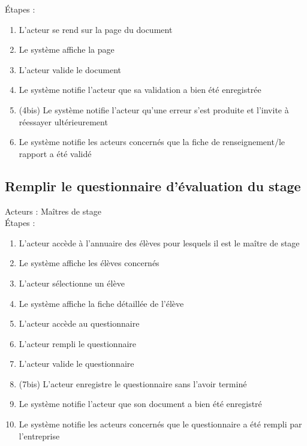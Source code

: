 \documentclass{scrreprt}
\begin{document}
\'Etapes : 
\begin{enumerate}
\item L’acteur se rend sur la page du document
\item Le système affiche la page
\item L’acteur valide le document
\item Le système notifie l’acteur que sa validation a bien été enregistrée
\item (4bis) Le système notifie l’acteur qu’une erreur s’est produite et l’invite à réessayer ultérieurement
\item Le système notifie les acteurs concernés que la fiche de renseignement/le rapport a été validé
\end{enumerate}


\subsection{Remplir le questionnaire d’\'evaluation du stage}
Acteurs : Ma\^itres de stage 
\\
\'Etapes : 
\begin{enumerate}
\item L’acteur acc\`ede \`a l’annuaire des \'el\`eves pour lesquels il est le ma\^itre de stage
\item Le syst\`eme affiche les \'el\`eves concern\'es
\item L’acteur s\'electionne un \'el\`eve
\item Le syst\`eme affiche la fiche d\'etaill\'ee de l’\'el\`eve
\item L’acteur acc\`ede au questionnaire 
\item L’acteur rempli le questionnaire 
\item L’acteur valide le questionnaire
\item (7bis) L’acteur enregistre le questionnaire sans l’avoir termin\'e
\item Le syst\`eme notifie l’acteur que son document a bien \'et\'e enregistr\'e
\item Le syst\`eme notifie les acteurs concern\'es que le questionnaire a \'et\'e rempli par l’entreprise
\end{enumerate}
\end{document}

